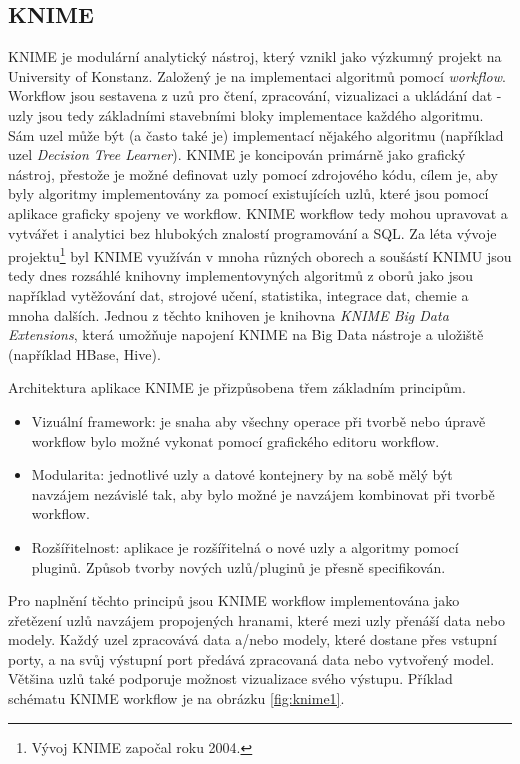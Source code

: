 \documentclass[11pt,twoside,a4paper]{book}
\begin{document}
		\subsection{KNIME} \label{sec:knime}
			KNIME je modulární analytický nástroj, který vznikl jako výzkumný projekt na University of Konstanz. Založený je na implementaci algoritmů pomocí \textit{workflow}. Workflow jsou sestavena z uzů pro čtení, zpracování, vizualizaci a ukládání dat - uzly jsou tedy základními stavebními bloky implementace každého algoritmu. Sám uzel může být (a často také je) implementací nějakého algoritmu (například uzel \textit{Decision Tree Learner}). KNIME je koncipován primárně jako grafický nástroj, přestože je možné definovat uzly pomocí zdrojového kódu, cílem je, aby byly algoritmy implementovány za pomocí existujících uzlů, které jsou pomocí aplikace graficky spojeny ve workflow. KNIME workflow tedy mohou upravovat a vytvářet i analytici bez hlubokých znalostí programování a SQL. Za léta vývoje projektu\footnote{Vývoj KNIME započal roku 2004.} byl KNIME využíván v mnoha různých oborech a soušástí KNIMU jsou tedy dnes rozsáhlé knihovny implementovyných algoritmů z oborů jako jsou například vytěžování dat, strojové učení, statistika, integrace dat, chemie a mnoha dalších. Jednou z těchto knihoven je knihovna \textit{KNIME Big Data Extensions}\cite{knimebd01}, která umožňuje napojení KNIME na Big Data nástroje a uložiště (například HBase, Hive).   

			Architektura aplikace KNIME je přizpůsobena třem základním principům.\cite{knime01}
\begin{itemize}
\item{Vizuální framework: je snaha aby všechny operace při tvorbě nebo úpravě workflow bylo možné vykonat pomocí grafického editoru workflow.}
\item{Modularita: jednotlivé uzly a datové kontejnery by na sobě mělý být navzájem nezávislé tak, aby bylo možné je navzájem kombinovat při tvorbě workflow.}
\item{Rozšířitelnost: aplikace je rozšířitelná o nové uzly a algoritmy pomocí pluginů. Způsob tvorby nových uzlů/pluginů je přesně specifikován.}
\end{itemize}

			Pro naplnění těchto principů jsou KNIME workflow implementována jako zřetězení uzlů navzájem propojených hranami, které mezi uzly přenáší data nebo modely. Každý uzel zpracovává data a/nebo modely, které dostane přes vstupní porty, a na svůj výstupní port předává zpracovaná data nebo vytvořený model. Většina uzlů také podporuje možnost vizualizace svého výstupu. Příklad schématu KNIME workflow je na obrázku \ref{fig:knime1}.  
\end{document}
